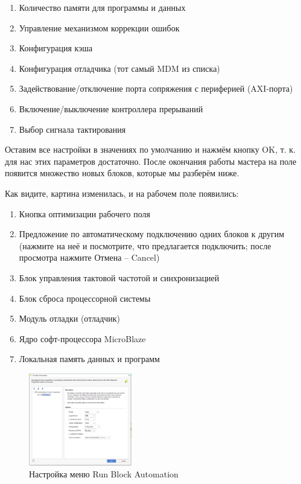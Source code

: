 \documentclass[a4paper,oneside ,10pt]{extreport}
\begin{document}
\begin{enumerate}
    \item Количество памяти для программы и данных
    \item Управление механизмом коррекции ошибок
    \item Конфигурация кэша
    \item Конфигурация отладчика (тот самый MDM из списка)
    \item Задействование/отключение порта сопряжения с периферией (AXI-порта)
    \item Включение/выключение контроллера прерываний
    \item Выбор сигнала тактирования
\end{enumerate}

Оставим все настройки в значениях по умолчанию и нажмём кнопку OK, т. к. 
для нас этих параметров достаточно. После окончания работы мастера на поле 
появится множество новых блоков, которые мы разберём ниже. 

Как видите, картина изменилась, и на рабочем поле появились:
\begin{enumerate}
	\item Кнопка оптимизации рабочего поля
	\item Предложение по автоматическому подключению одних блоков к другим
(нажмите на неё и посмотрите, что предлагается подключить; после просмотра 
нажмите Отмена – Cancel)
      \item Блок управления тактовой частотой и синхронизацией
	\item Блок сброса процессорной системы
	\item Модуль отладки (отладчик)
	\item Ядро софт-процессора MicroBlaze
	\item Локальная память данных и программ
\end{enumerate}

\begin{figure}[!ht]
	\centering
	\includegraphics[width=0.4\textwidth]{image/m_18.png}
	\caption{Настройка меню Run Block Automation}
	\label{m_18}
\end{figure}
\end{document}
